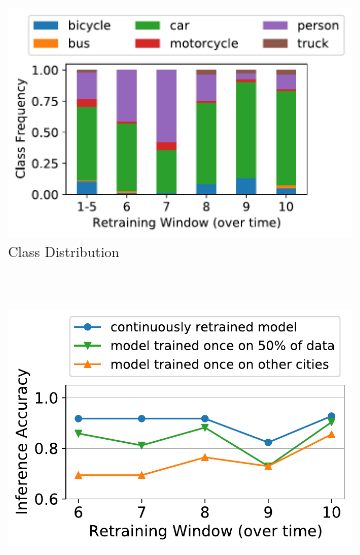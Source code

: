 \begin{figure}[t!]
  \centering
  \begin{subfigure}[t]{0.48\linewidth}
    \centering
    \includegraphics[width=\linewidth]{ekya/figures/motivation/incr_learn_motivation/motivation_cityscapes_zurich_classdist.pdf}
    \caption{\small Class Distribution}
    \label{fig:jena-classdist}
  \end{subfigure}
    ~~
  \begin{subfigure}[t]{0.48\linewidth}
    \centering
    \includegraphics[width=\linewidth]{ekya/figures/motivation/incr_learn_motivation/new_motivation_cityscapes_zurich_accuracy.pdf}
    

\end{subfigure}
\end{figure}
